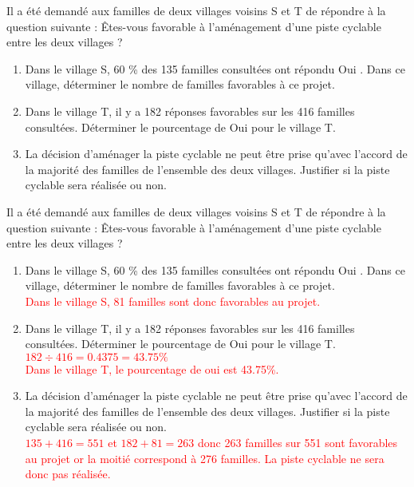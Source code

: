\begin{exercice*}
    Il a été demandé aux familles de deux villages voisins S et T de répondre à la question suivante :
    \og{} Êtes-vous favorable à l’aménagement d’une piste cyclable entre les deux villages ? \fg{}
    \begin{enumerate}
        \item Dans le village S, 60 \% des 135 familles consultées ont répondu \og{} Oui \fg{}. Dans ce village, déterminer le nombre de familles favorables à ce projet.
        \item Dans le village T, il y a 182 réponses favorables sur les 416 familles consultées. Déterminer le pourcentage de \og{} Oui \fg{} pour le village T.
        \item La décision d’aménager la piste cyclable ne peut être prise qu’avec l’accord de la majorité des familles de l’ensemble des deux villages. Justifier si la piste cyclable sera réalisée ou non.
    \end{enumerate}
\end{exercice*}
\begin{corrige}
    Il a été demandé aux familles de deux villages voisins S et T de répondre à la question suivante :
    \og{} Êtes-vous favorable à l’aménagement d’une piste cyclable entre les deux villages ? \fg{}
    \begin{enumerate}
        \item Dans le village S, 60 \% des 135 familles consultées ont répondu \og{} Oui \fg{}. Dans ce village, déterminer le nombre de familles favorables à ce projet.\\
        \textcolor{red}{%
        Dans le village S, 81 familles sont donc favorables au projet.
        }
        \item Dans le village T, il y a 182 réponses favorables sur les 416 familles consultées. Déterminer le pourcentage de \og{} Oui \fg{} pour le village T.\\
        \textcolor{red}{%
        $182\div 416=\num{0.4375}=\num{43.75}\%$\\
        Dans le village T, le pourcentage de \og{} oui \fg{} est \num{43.75}\%.
        }
        \item La décision d’aménager la piste cyclable ne peut être prise qu’avec l’accord de la majorité des familles de l’ensemble des deux villages. Justifier si la piste cyclable sera réalisée ou non.\\
        \textcolor{red}{%
        $135+416=551$ et $182+81=263$ donc 263 familles sur 551 sont favorables au projet or la moitié correspond à 276 familles. La piste cyclable ne sera donc pas réalisée.
        }
    \end{enumerate}
\end{corrige}

